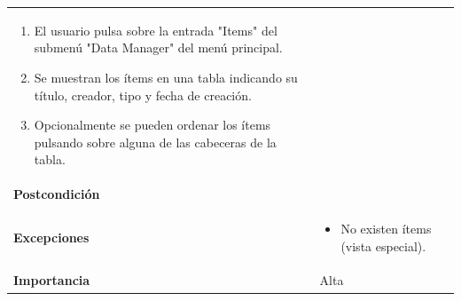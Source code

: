 \documentclass[
]{article}
\providecommand{\tightlist}{%
  \setlength{\itemsep}{0pt}\setlength{\parskip}{0pt}}
\begin{document}
\begin{longtable}[]{@{}ll@{}}
\begin{minipage}[t]{0.75\columnwidth}
\begin{enumerate}
\def\labelenumi{\arabic{enumi}.}
\tightlist
\item
  El usuario pulsa sobre la entrada "Items" del submenú "Data Manager"
  del menú principal.
\item
  Se muestran los ítems en una tabla indicando su título, creador, tipo
  y fecha de creación.
\item
  Opcionalmente se pueden ordenar los ítems pulsando sobre alguna de las
  cabeceras de la tabla.
\end{enumerate}\strut
\end{minipage}\tabularnewline
\begin{minipage}[t]{0.19\columnwidth}\raggedright
\textbf{Postcondición}\strut
\end{minipage} & \begin{minipage}[t]{0.75\columnwidth}\raggedright
\strut
\end{minipage}\tabularnewline
\begin{minipage}[t]{0.19\columnwidth}\raggedright
\textbf{Excepciones}\strut
\end{minipage} & \begin{minipage}[t]{0.75\columnwidth}\raggedright
\begin{itemize}
\tightlist
\item
  No existen ítems (vista especial).
\end{itemize}\strut
\end{minipage}\tabularnewline
\begin{minipage}[t]{0.19\columnwidth}\raggedright
\textbf{Importancia}\strut
\end{minipage} & \begin{minipage}[t]{0.75\columnwidth}\raggedright
Alta\strut
\end{minipage}\tabularnewline
\bottomrule
\end{longtable}
\end{document}
